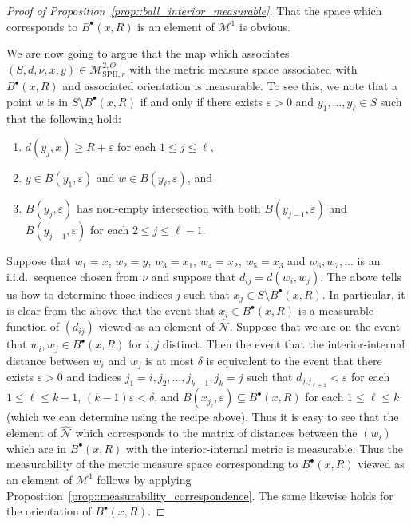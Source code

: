\documentclass[10pt]{amsart}
\let\mathcal\mathscr
\newcommand{\sbullet}{{\scriptscriptstyle\bullet}}
\let\epsilon\varepsilon
\theoremstyle{plain}
\numberwithin{theorem}{section}
\theoremstyle{definition}
\newcommand\gmsspacer{{\mathcal M}_{\mathrm{SPH},r}}
\newcommand\mmspace{{\mathcal M}}
\newcommand{\matrixmspace}{\mathcal N}
\let\wh\widehat
\newcommand{\fb}[2]{B^\sbullet(#1,#2)}
\begin{document}
\begin{proof}[Proof of Proposition~\ref{prop::ball_interior_measurable}]
That the space which corresponds to $\fb{x}{R}$ is an element of $\mmspace^1$ is obvious.

We are now going to argue that the map which associates $(S,d,\nu,x,y) \in \gmsspacer^{2,O}$ with the metric measure space associated with $\fb{x}{R}$ and associated orientation is measurable. To see this, we note that a point $w$ is in $S \setminus \fb{x}{R}$ if and only if there exists $\epsilon > 0$ and $y_1,\ldots,y_\ell \in S$ such that the following hold:
\begin{enumerate}
\item $d(y_j,x) \geq R+\epsilon$ for each $1 \leq j \leq \ell$,
\item $y \in B(y_1,\epsilon)$ and $w \in B(y_\ell,\epsilon)$, and
\item $B(y_j,\epsilon)$ has non-empty intersection with both $B(y_{j-1},\epsilon)$ and $B(y_{j+1},\epsilon)$ for each $2 \leq j \leq \ell-1$.
\end{enumerate}
Suppose that $w_1=x$, $w_2 = y$, $w_3=x_1$, $w_4=x_2$, $w_5 = x_3$ and $w_6,w_7,\ldots$ is an i.i.d.\ sequence chosen from $\nu$ and suppose that $d_{ij} = d(w_i,w_j)$. The above tells us how to determine those indices $j$ such that $x_j \in S \setminus \fb{x}{R}$. In particular, it is clear from the above that the event that $x_i \in \fb{x}{R}$ is a measurable function of $(d_{ij})$ viewed as an element of $\wh{\matrixmspace}$. Suppose that we are on the event that $w_i,w_j \in \fb{x}{R}$ for $i,j$ distinct. Then the event that the interior-internal distance between $w_i$ and $w_j$ is at most $\delta$ is equivalent to the event that there exists $\epsilon > 0$ and indices $j_1 = i,j_2,\ldots,j_{k-1},j_k=j$ such that $d_{j_\ell j_{\ell+1}} < \epsilon$ for each $1 \leq \ell \leq k-1$, $(k-1) \epsilon < \delta$, and $B(x_{j_\ell},\epsilon) \subseteq \fb{x}{R}$ for each $1 \leq \ell \leq k$ (which we can determine using the recipe above). Thus it is easy to see that the element of $\wh{\matrixmspace}$ which corresponds to the matrix of distances between the $(w_i)$ which are in $\fb{x}{R}$ with the interior-internal metric is measurable. Thus the measurability of the metric measure space corresponding to $\fb{x}{R}$ viewed as an element of $\mmspace^1$ follows by applying Proposition~\ref{prop::measurability_correspondence}. The same likewise holds for the orientation of $\fb{x}{R}$.


\end{proof}
\end{document}
